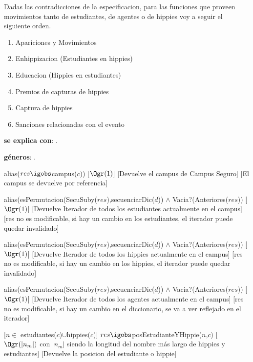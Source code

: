 
Dadas las contradicciones de la especificacion, para las funciones que proveen movimientos tanto de estudiantes, de agentes o de hippies voy a seguir el siguiente orden.

\begin{enumerate}
	\item Apariciones y Movimientos
	\item Enhippizacion (Estudiantes en hippies)
	\item Educacion (Hippies en estudiantes)
	\item Premios de capturas de hippies
	\item Captura de hippies
	\item Sanciones relacionadas con el evento
\end{enumerate}

\begin{Interfaz}

	\textbf{se explica con}: .

	\textbf{géneros}: .


	{alias($res \igobs $campus($c$))}
	[$\Ogr(1)$]
	[Devuelve el campus de Campus Seguro]
	[El campus se devuelve por referencia]

	{alias(esPermutacion(SecuSuby($res$),secuenciarDic($d$)) $\land$ Vacia?(Anteriores($res$))}
	[$\Ogr(1)$]
	[Devuelve Iterador de todos los estudiantes actualmente en el campus]
	[res no es modificable, si hay un cambio en los estudiantes, el iterador puede quedar invalidado]
  
	{alias(esPermutacion(SecuSuby($res$),secuenciarDic($d$)) $\land$ Vacia?(Anteriores($res$))}
	[$\Ogr(1)$]
	[Devuelve Iterador de todos los hippies actualmente en el campus]
	[res no es modificable, si hay un cambio en los hippies, el iterador puede quedar invalidado]

	{alias(esPermutacion(SecuSuby($res$),secuenciarDic($d$)) $\land$ Vacia?(Anteriores($res$))}
	[$\Ogr(1)$]
	[Devuelve Iterador de todos los agentes actualmente en el campus]
	[res no es modificable, si hay un cambio en el diccionario, se va a ver reflejado en el iterador]

	[$n \in$ estudiantes($c$)$\cup$hippies($c$)]
	{$res \igobs$posEstudianteYHippie($n$,$c$)}
	[$\Ogr(|n_m|)$ con $|n_m|$ siendo la longitud del nombre más largo de hippies y estudiantes]
	[Devuelve la posicion del estudiante o hippie]


\end{Interfaz}
